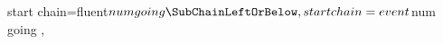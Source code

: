 start chain=fluent${num} going \SubChainLeftOrBelow,
start chain=event${num} going \SubChainRightOrAbove,
